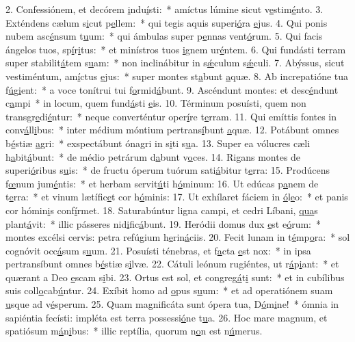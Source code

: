 2. Confessiónem, et decórem \uline{i}ndu\uline{í}sti:~* amíctus lúmine sicut v\uline{e}stim\uline{é}nto.
3. Exténdens cælum s\uline{i}cut p\uline{e}llem:~* qui tegis aquis superi\uline{ó}ra \uline{e}jus.
4. Qui ponis nubem asc\uline{é}nsum t\uline{u}um:~* qui ámbulas super p\uline{e}nnas vent\uline{ó}rum.
5. Qui facis ángelos tuos, sp\uline{í}r\uline{i}tus:~* et minístros tuos \uline{i}gnem ur\uline{é}ntem.
6. Qui fundásti terram super stabilit\uline{á}tem s\uline{u}am:~* non inclinábitur in s\uline{ǽ}culum s\uline{ǽ}culi.
7. Abýssus, sicut vestiméntum, am\uline{í}ctus \uline{e}jus:~* super montes st\uline{a}bunt \uline{a}quæ.
8. Ab increpatióne tua f\uline{ú}g\uline{i}ent:~* a voce tonítrui tui f\uline{o}rmid\uline{á}bunt.
9. Ascéndunt montes: et desc\uline{é}ndunt c\uline{a}mpi~* in locum, quem fund\uline{á}sti \uline{e}is.
10. Términum posuísti, quem non transgr\uline{e}di\uline{é}ntur:~* neque converténtur oper\uline{í}re t\uline{e}rram.
11. Qui emíttis fontes in conv\uline{á}ll\uline{i}bus:~* inter médium móntium pertrans\uline{í}bunt \uline{a}quæ.
12. Potábunt omnes b\uline{é}stiæ \uline{a}gri:~* exspectábunt ónagri in s\uline{i}ti s\uline{u}a.
13. Super ea vólucres cæli h\uline{a}bit\uline{á}bunt:~* de médio petrárum d\uline{a}bunt v\uline{o}ces.
14. Rigans montes de superi\uline{ó}ribus s\uline{u}is:~* de fructu óperum tuórum sati\uline{á}bitur t\uline{e}rra:
15. Prodúcens f\uline{œ}num jum\uline{é}ntis:~* et herbam servit\uline{ú}ti h\uline{ó}minum:
16. Ut edúcas p\uline{a}nem de t\uline{e}rra:~* et vinum lætífic\uline{e}t cor h\uline{ó}minis:
17. Ut exhílaret fáciem in \uline{ó}l\uline{e}o:~* et panis cor hómin\uline{i}s conf\uline{í}rmet.
18. Saturabúntur ligna campi, et cedri Líbani, \uline{qua}s plant\uline{á}vit:~* illic pásseres nid\uline{i}fic\uline{á}bunt.
19. Heródii domus dux \uline{e}st e\uline{ó}rum:~* montes excélsi cervis: petra refúgium h\uline{e}rin\uline{á}ciis.
20. Fecit lunam in t\uline{é}mp\uline{o}ra:~* sol cognóvit occ\uline{á}sum s\uline{u}um.
21. Posuísti ténebras, et f\uline{a}cta \uline{e}st nox:~* in ipsa pertransíbunt omnes b\uline{é}stiæ s\uline{i}lvæ.
22. Cátuli leónum rugiéntes, ut r\uline{á}p\uline{i}ant:~* et quærant a Deo \uline{e}scam s\uline{i}bi.
23. Ortus est sol, et congreg\uline{á}t\uline{i} sunt:~* et in cubílibus suis coll\uline{o}cab\uline{ú}ntur.
24. Exíbit homo ad \uline{o}pus s\uline{u}um:~* et ad operatiónem suam \uline{u}sque ad v\uline{é}sperum.
25. Quam magnificáta sunt ópera tua, D\uline{ó}m\uline{i}ne!~* ómnia in sapiéntia fecísti: impléta est terra possessi\uline{ó}ne t\uline{u}a.
26. Hoc mare magnum, et spatiósum m\uline{á}n\uline{i}bus:~* illic reptília, quorum n\uline{o}n est n\uline{ú}merus.
